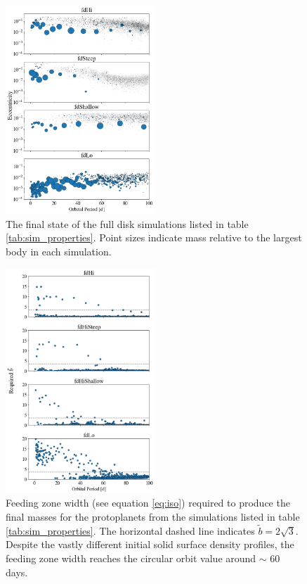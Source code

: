 \documentclass[twocolumn]{aastex63}
\begin{document}
\begin{figure}
\begin{center}
    \includegraphics[width=0.5\textwidth]{figures/surfden_profiles.png}
    \caption{The final state of the full disk simulations listed in table \ref{tab:sim_properties}. 
    Point sizes indicate mass relative to the largest body in each simulation.\label{fig:surfden_profiles}}
\end{center}
\end{figure}

\begin{figure}
\begin{center}
    \includegraphics[width=0.5\textwidth]{figures/surfden_b.png}
    \caption{Feeding zone width (see equation \ref{eq:iso}) required to produce the final masses for the protoplanets from the 
    simulations listed in table \ref{tab:sim_properties}. The horizontal dashed line indicates $\tilde{b} = 2 \sqrt{3}$. Despite the 
    vastly different initial solid surface density profiles, the feeding zone width reaches the circular orbit value around $\sim$ 60 
    days. \label{fig:surfden_b}}
\end{center}
\end{figure}
\end{document}
